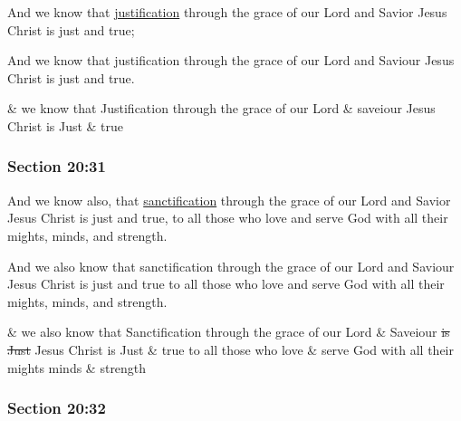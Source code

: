 		And we know that \hyperref[JUSTIFICATION]{justification} through the grace of our Lord and Savior Jesus Christ is just and true;

		\begin{framed}
		\scriptsize
			\begin{compactdesc}
				\item[JSP] And we know that justification through the grace of our Lord and Saviour Jesus Christ is just and true.
				\item[RB1] \& we know that Justification through the grace of our Lord \& saveiour Jesus Christ is Just \& true
			\end{compactdesc}
		\end{framed}

	\subsubsection{Section 20:31} %
		\label{DC20-31}

		And we know also, that \hyperref[SANCTIFICATION]{sanctification} through the grace of our Lord and Savior Jesus Christ is just and true, to all those who love and serve God with all their mights, minds, and strength.

		\begin{framed}
		\scriptsize
			\begin{compactdesc}
				\item[JSP] And we also know that sanctification through the grace of our Lord and Saviour Jesus Christ is just and true to all those who love and serve God with all their mights, minds, and strength.
				\item[RB1] \& we also know that Sanctification through the grace of our Lord \& Saveiour \sout{is Just} Jesus Christ is Just \& true to all those who love \& serve God with all their mights minds \& strength
			\end{compactdesc}
		\end{framed}

	\subsubsection{Section 20:32} %
		\label{DC20-32}

